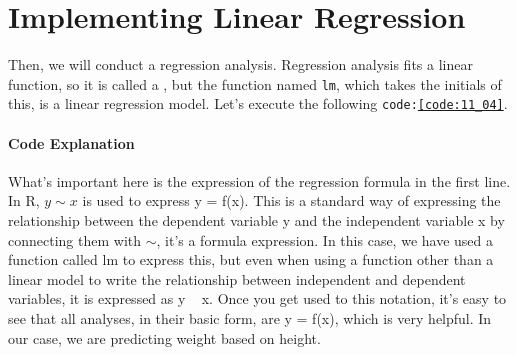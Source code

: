\documentclass{ltjbook}
\begin{document}
\section{Implementing Linear Regression}
Then, we will conduct a regression analysis. Regression analysis fits a linear function, so it is called a , but the function named \texttt{lm}, which takes the initials of this, is a linear regression model. Let's execute the following \texttt{code:\ref{code:11_04}}.


\paragraph{Code Explanation}


What's important here is the expression of the regression formula in the first line. In R, $y\sim x $ is used to express y = f(x). This is a standard way of expressing the relationship between the dependent variable y and the independent variable x by connecting them with $\sim$, it's a formula expression. In this case, we have used a function called lm to express this, but even when using a function other than a linear model to write the relationship between independent and dependent variables, it is expressed as y ~ x. Once you get used to this notation, it's easy to see that all analyses, in their basic form, are y = f(x), which is very helpful. In our case, we are predicting weight based on height.
\end{document}
